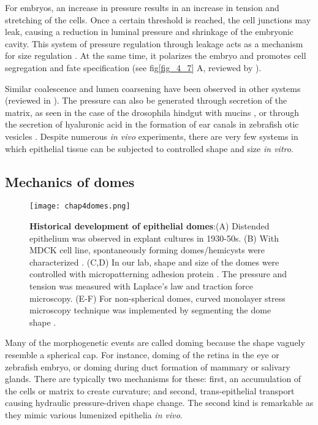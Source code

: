 For embryos, an increase in pressure results in an increase in tension and stretching of the cells. Once a certain threshold is reached, the cell junctions may leak, causing a reduction in luminal pressure and shrinkage of the embryonic cavity. This system of pressure regulation through leakage acts as a mechanism for size regulation \cite{chan2019}. At the same time, it polarizes the embryo and promotes cell segregation and fate specification (see fig\ref{fig_4_7} A, reviewed by \cite{chan2020}).

Similar coalescence and lumen coarsening have been observed in other systems (reviewed in \cite{schliffka2019}). The pressure can also be generated through secretion of the matrix, as seen in the case of the drosophila hindgut with mucins \cite{syed2012}, or through the secretion of hyaluronic acid in the formation of ear canals in zebrafish otic vesicles \cite{munjal2021}. Despite numerous
\textit{in vivo} experiments, there are very few systems in which epithelial tissue can be subjected to controlled shape and size \textit{in vitro}.

\hypertarget{mechanics-of-domes}{%
	\subsection{Mechanics of domes}\label{mechanics-of-domes}}

\begin{figure}
	\centering
	\texttt{[image: chap4domes.png]}
	\caption{\label{fig_4_8} \textbf{Historical development of epithelial domes}:(A) Distended epithelium was observed in explant cultures in 1930-50s. (B) With MDCK cell line, spontaneously forming domes/hemicysts were characterized \cite{leighton1969, valentich1979}. (C,D) In our lab, shape and size of the domes were controlled with micropatterning adhesion protein \cite{latorre2018}. The pressure and tension was measured with Laplace's law and traction force microscopy. (E-F) For non-spherical domes, curved monolayer stress microscopy technique was implemented by segmenting the dome shape \cite{marin-llaurado2022}.
	}
\end{figure}

Many of the morphogenetic events are called doming because the shape vaguely resemble a spherical cap. For instance, doming of the retina in the eye or zebrafish embryo, or doming during duct formation of mammary or salivary glands. There are typically two mechanisms for these: first, an accumulation of the cells or matrix to create curvature; and second, trans-epithelial transport causing hydraulic pressure-driven shape change. The second kind is remarkable as they mimic various lumenized epithelia \textit{in vivo}.

